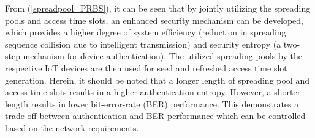 \documentclass[journal,10pt]{IEEEtran}
\begin{document}
From (\ref{spreadpool_PRBS}), it can be seen that by jointly utilizing the spreading pools and access time slots, an enhanced security mechanism can be developed, which provides a higher degree of system efficiency (reduction in spreading sequence collision due to intelligent transmission) and security entropy (a two-step mechanism for device authentication). The utilized spreading pools by the respective IoT devices are then used for seed and refreshed access time slot generation. Herein, it should be noted that a longer length of spreading pool and access time slots results in a higher authentication entropy. However, a shorter length results in lower bit-error-rate (BER) performance. This demonstrates a trade-off between authentication and BER performance which can be controlled based on the network requirements.  
\end{document}
